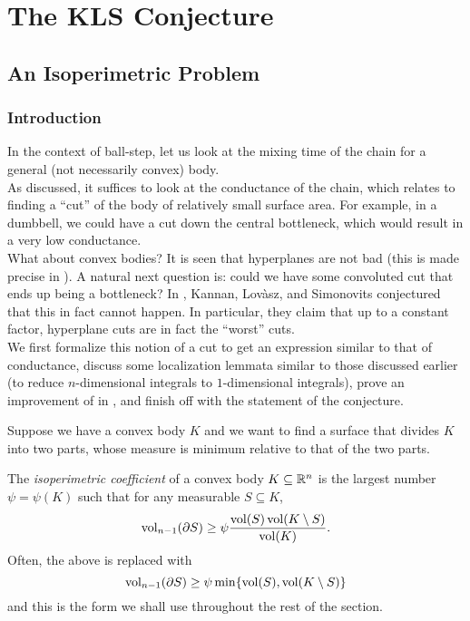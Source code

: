 \section{The KLS Conjecture}

\subsection{An Isoperimetric Problem}

\subsubsection{Introduction}

In the context of ball-step, let us look at the mixing time of the chain for a general (not necessarily convex) body.\\
As discussed, it suffices to look at the conductance of the chain, which relates to finding a ``cut'' of the body of relatively small surface area. For example, in a dumbbell, we could have a cut down the central bottleneck, which would result in a very low conductance.\\
What about convex bodies? It is seen that hyperplanes are not bad (this is made precise in ). A natural next question is: could we have some convoluted cut that ends up being a bottleneck? In \cite{KLSConjecture}, Kannan, Lov\`asz, and Simonovits conjectured that this in fact cannot happen. In particular, they claim that up to a constant factor, hyperplane cuts are in fact the ``worst'' cuts.\\
We first formalize this notion of a cut to get an expression similar to that of conductance, discuss some localization lemmata similar to those discussed earlier (to reduce $n$-dimensional integrals to $1$-dimensional integrals), prove an improvement of  in , and finish off with the statement of the conjecture.

Suppose we have a convex body $K$ and we want to find a surface that divides $K$ into two parts, whose measure is minimum relative to that of the two parts.

\begin{fdef}
	\label{def: isoperimetric coefficient}
	The \textit{isoperimetric coefficient} of a convex body $K\subseteq\mathbb{R}^n$ is the largest number $\psi=\psi(K)$ such that for any measurable $S\subseteq K$,
	\[ \operatorname{vol}_{n-1}(\partial S) \geq \psi \frac{\operatorname{vol}(S)\operatorname{vol}(K\setminus S)}{\operatorname{vol}(K)}. \]
	Often, the above is replaced with
	\[ \operatorname{vol}_{n-1}(\partial S) \geq \psi \min\{\operatorname{vol}(S), \operatorname{vol}(K\setminus S)\} \]
	and this is the form we shall use throughout the rest of the section.
\end{fdef}

